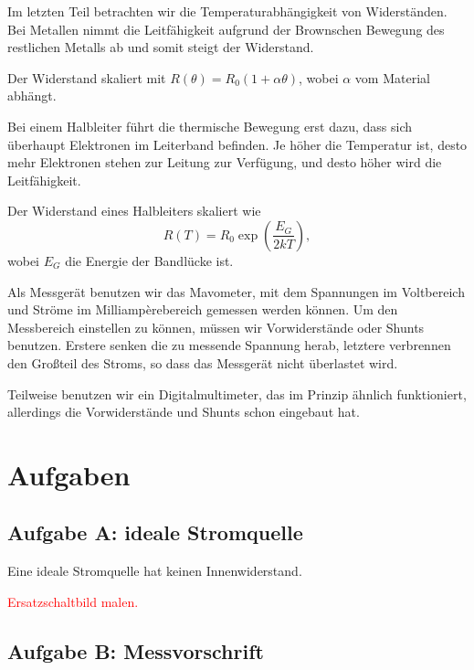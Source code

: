 \documentclass[11pt, ngerman]{article}
\begin{document}
Im letzten Teil betrachten wir die Temperaturabhängigkeit von Widerständen. Bei
Metallen nimmt die Leitfähigkeit aufgrund der Brownschen Bewegung des
restlichen Metalls ab und somit steigt der Widerstand.

Der Widerstand skaliert mit $R(\theta) = R_0 (1 + \alpha \theta)$, wobei
$\alpha$ vom Material abhängt.

Bei einem Halbleiter führt die thermische Bewegung erst dazu, dass sich
überhaupt Elektronen im Leiterband befinden. Je höher die Temperatur ist, desto
mehr Elektronen stehen zur Leitung zur Verfügung, und desto höher wird die
Leitfähigkeit.

Der Widerstand eines Halbleiters skaliert wie
\[ R(T) = R_0 \exp \left( \frac{E_G}{2 k T} \right), \]
wobei $E_G$ die Energie der Bandlücke ist.

Als Messgerät benutzen wir das Mavometer, mit dem Spannungen im Voltbereich und
Ströme im Milliampèrebereich gemessen werden können. Um den Messbereich
einstellen zu können, müssen wir Vorwiderstände oder Shunts benutzen. Erstere
senken die zu messende Spannung herab, letztere verbrennen den Großteil des
Stroms, so dass das Messgerät nicht überlastet wird.

Teilweise benutzen wir ein Digitalmultimeter, das im Prinzip ähnlich
funktioniert, allerdings die Vorwiderstände und Shunts schon eingebaut hat.


\section{Aufgaben}

\subsection{Aufgabe A: ideale Stromquelle}

Eine ideale Stromquelle hat keinen Innenwiderstand.

\textcolor{red}{Ersatzschaltbild malen.}

\subsection{Aufgabe B: Messvorschrift}
\end{document}

